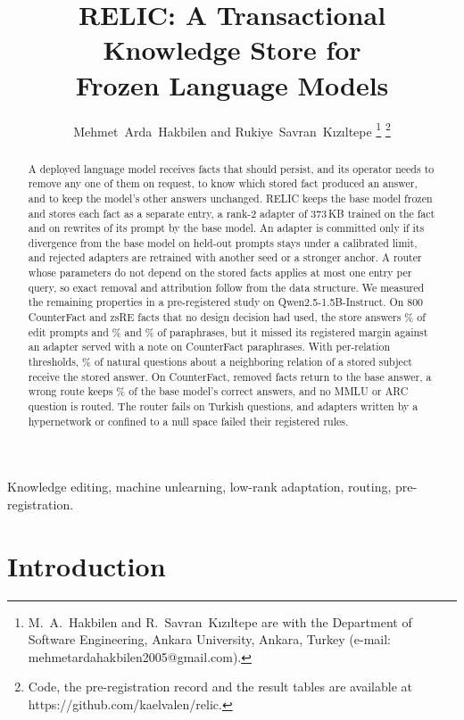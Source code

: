 \documentclass[journal,10pt]{IEEEtran}
\title{RELIC: A Transactional Knowledge Store for\\ Frozen Language Models}
\author{Mehmet~Arda~Hakbilen and Rukiye~Savran~K{\i}z{\i}ltepe%
\thanks{M.~A.~Hakbilen and R.~Savran~K{\i}z{\i}ltepe are with the Department of
Software Engineering, Ankara University, Ankara, Turkey (e-mail:
mehmetardahakbilen2005@gmail.com).}%
\thanks{Code, the pre-registration record and the result tables are available at
https://github.com/kaelvalen/relic.}}
\begin{document}
\maketitle

\begin{abstract}
A deployed language model receives facts that should persist, and its operator needs to remove any one
of them on request, to know which stored fact produced an answer, and to keep the model's other answers
unchanged. RELIC keeps the base model frozen and stores each fact as a separate entry, a rank-2 adapter
of 373\,KB trained on the fact and on rewrites of its prompt by the base model. An adapter is committed
only if its divergence from the base model on held-out prompts stays under a calibrated limit, and
rejected adapters are retrained with another seed or a stronger anchor. A router whose parameters do not
depend on the stored facts applies at most one entry per query, so exact removal and attribution follow
from the data structure. We measured the remaining properties in a pre-registered study on
Qwen2.5-1.5B-Instruct. On 800 CounterFact and zsRE facts that no design decision had used, the store
answers \% of edit prompts and
\% and \% of
paraphrases, but it missed its registered margin against an adapter served with a note on CounterFact
paraphrases. With per-relation thresholds, \% of
natural questions about a neighboring relation of a stored subject receive the stored answer. On
CounterFact, removed facts return to the base answer, a wrong route keeps
\% of the base model's correct answers, and no MMLU or
ARC question is routed. The router fails on Turkish questions, and adapters written by a hypernetwork or
confined to a null space failed their registered rules.
\end{abstract}

\begin{IEEEkeywords}
Knowledge editing, machine unlearning, low-rank adaptation, routing, pre-registration.
\end{IEEEkeywords}

\section{Introduction}
\label{sec:intro}
\end{document}
